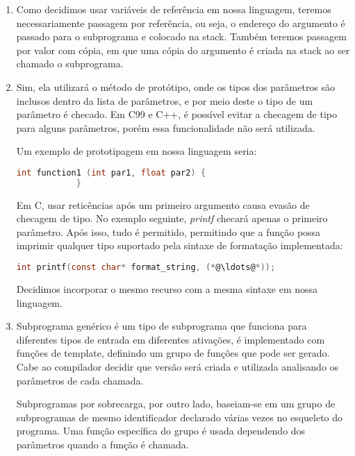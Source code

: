 \documentclass[12pt, a4paper]{article}
\begin{document}
\begin{enumerate}
        \item
        Como decidimos usar variáveis de referência em nossa linguagem, teremos
        necessariamente passagem por referência, ou seja, o endereço do
        argumento é passado para o subprograma e colocado na stack. Também
        teremos passagem por valor com cópia, em que uma cópia do argumento é
        criada na stack ao ser chamado o subprograma.

        \item
        Sim, ela utilizará o método de protótipo, onde os tipos dos parâmetros
        são inclusos dentro da lista de parâmetros, e por meio deste o tipo de
        um parâmetro é checado. Em C99 e C++, é possível evitar a checagem de
        tipo para alguns parâmetros, porém essa funcionalidade não será
        utilizada.

        Um exemplo de prototipagem em nossa linguagem seria:
        \begin{lstlisting}[language=C]
            int function1 (int par1, float par2) {
            }
        \end{lstlisting}

        Em C, usar reticências após um primeiro argumento causa evasão de
        checagem de tipo. No exemplo seguinte, \emph{printf} checará apenas o
        primeiro parâmetro. Após isso, tudo é permitido, permitindo que a
        função possa imprimir qualquer tipo suportado pela sintaxe de
        formatação implementada:
        \begin{lstlisting}[language=C]
        int printf(const char* format_string, (*@\ldots@*));
        \end{lstlisting}

        Decidimos incorporar o mesmo recurso com a mesma sintaxe em nossa
        linguagem.

        \item
        Subprograma genérico é um tipo de subprograma que funciona para
        diferentes tipos de entrada em diferentes ativações, é implementado com
        funções de template, definindo um grupo de funções que pode ser gerado.
        Cabe ao compilador decidir que versão será criada e utilizada
        analisando os parâmetros de cada chamada.

        Subprogramas por sobrecarga, por outro lado, baseiam-se em um grupo de
        subprogramas de mesmo identificador declarado várias vezes no esqueleto
        do programa. Uma função específica do grupo é usada dependendo dos
        parâmetros quando a função é chamada.


\end{enumerate}
\end{document}
